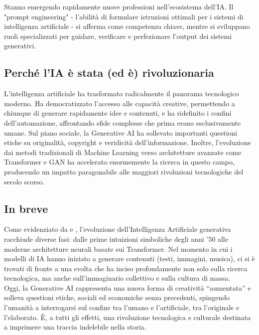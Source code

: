\documentclass[14pt]{extbook}
\begin{document}
Stanno emergendo rapidamente nuove professioni nell'ecosistema dell'IA. Il "prompt engineering" - l'abilità di formulare istruzioni ottimali per i sistemi di intelligenza artificiale - si afferma come competenza chiave, mentre si sviluppano ruoli specializzati per guidare, verificare e perfezionare l'output dei sistemi generativi.\\

\subsection{Perché l'IA è stata (ed è) rivoluzionaria}
L'intelligenza artificiale ha trasformato radicalmente il panorama tecnologico moderno. Ha democratizzato l'accesso alle capacità creative, permettendo a chiunque di generare rapidamente idee e contenuti, e ha ridefinito i confini dell'automazione, affrontando sfide complesse che prima erano esclusivamente umane. Sul piano sociale, la Generative AI ha sollevato importanti questioni etiche su originalità, copyright e veridicità dell'informazione. Inoltre, l'evoluzione dai metodi tradizionali di Machine Learning verso architetture avanzate come Transformer e GAN ha accelerato enormemente la ricerca in questo campo, producendo un impatto paragonabile alle maggiori rivoluzioni tecnologiche del secolo scorso.\\

\subsection{In breve}
Come evidenziato da \cite{russell2021artificial} e \cite{mitchell2019guide}, l'evoluzione dell’Intelligenza Artificiale generativa racchiude diverse fasi: dalle prime intuizioni simboliche degli anni ’50 alle moderne architetture neurali basate sui Transformer. Nel momento in cui i modelli di IA hanno iniziato a generare contenuti (testi, immagini, musica), ci si è trovati di fronte a una svolta che ha inciso profondamente non solo sulla ricerca tecnologica, ma anche sull’immaginario collettivo e sulla cultura di massa.\\

Oggi, la Generative AI rappresenta una nuova forma di creatività “aumentata” e solleva questioni etiche, sociali ed economiche senza precedenti, spingendo l’umanità a interrogarsi sul confine tra l’umano e l’artificiale, tra l’originale e l’elaborato. È, a tutti gli effetti, una rivoluzione tecnologica e culturale destinata a imprimere una traccia indelebile nella storia.\\
\end{document}
